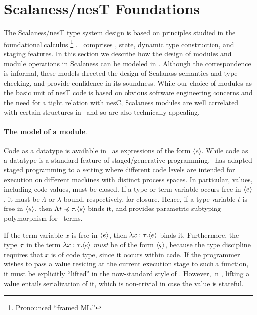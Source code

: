 \section{Scalaness/nesT Foundations} 
\label{section-framedml}

The Scalaness/nesT type system design is based on principles studied in the foundational
calculus \fml\footnote{Pronounced ``framed ML.''} \cite{FramedML}. \fml\ comprises \fsub, state,
dynamic type construction, and staging features. In this section we describe how the design of
modules and module operations in Scalaness can be modeled in \fml. Although the correspondence
is informal, these models directed the design of Scalaness semantics and type checking, and
provide confidence in its soundness. While our choice of modules as the basic unit of nesT code
is based on obvious software engineering concerns and the need for a tight relation with nesC,
Scalaness modules are well correlated with certain structures in \fml\ and so are also
technically appealing.

\paragraph{The model of a module.} Code as a datatype is available in \fml\ as expressions of
the form $\langle e \rangle$. While code as a datatype is a standard feature of
staged/generative programming, \fml\ has adapted staged programming to a setting where different
code levels are intended for execution on different machines with distinct process spaces. In
particular, values, including code values, must be closed. If a type or term variable occurs
free in $\langle e \rangle$, it must be $\Lambda$ or $\lambda$ bound, respectively, for closure. Hence,
if a type variable $t$ is free in $\langle e \rangle$, then $\Lambda t \preccurlyeq \tau . \langle e \rangle$ binds
it, and provides parametric subtyping polymorphism for \fml\ terms.

If the term variable $x$ is free in $\langle e \rangle$, then $\lambda x : \tau. \langle e \rangle$ binds it.
Furthermore, the type $\tau$ in the term $\lambda x : \tau. \langle e \rangle$ \emph{must} be of the form
$\langle \varsigma \rangle$, because the type discipline requires that $x$ is of code type, since it occurs
within code. If the programmer wishes to pass a value residing at the current execution stage to
such a function, it must be explicitly ``lifted'' in the now-standard style of
\cite{Taha-MetaML}. However, in \fml, lifting a value entails serialization of it, which is
non-trivial in case the value is stateful.


